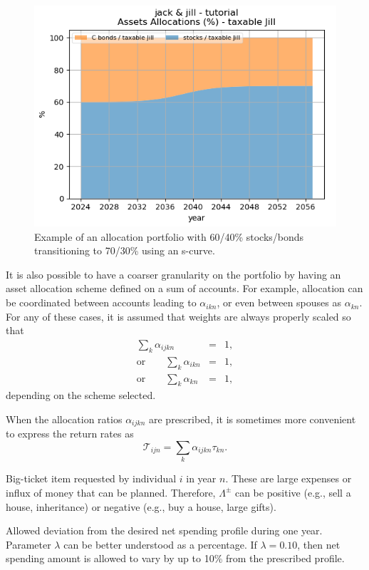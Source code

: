\documentclass{report}[fleqn,11pt]
\begin{document}
\begin{description}[leftmargin=4em,style=multiline]
	\begin{figure}[t]
	\includegraphics{allocations.png}
		\caption{\small Example of an allocation portfolio with 60/40\% stocks/bonds 
		transitioning to 70/30\% using an s-curve. \label{Fig:allocations}}
	\end{figure}
	It is also possible to have a coarser granularity on the portfolio by
	having an asset allocation scheme
	defined on a sum of accounts. For example, allocation can be coordinated between accounts
	leading to $\alpha_{ikn}$, or even between spouses as $\alpha_{kn}$.
	For any of these cases, it is assumed that weights are always properly scaled so that
	\begin{eqnarray}
		\sum_k \alpha_{ijkn} &=& 1, \nonumber\\
		\text{or} \qquad \sum_k \alpha_{ikn} &=& 1, \nonumber\\
		\text{or} \qquad \sum_k \alpha_{kn} &=& 1,
	\end{eqnarray}
	depending on the scheme selected.

\item[$\mathcal{T}_{ijn}$]
	When the allocation ratios $\alpha_{ijkn}$ are prescribed,
	it is sometimes more convenient to express the return rates as
	\begin{equation}
		\mathcal{T}_{ijn} = \sum_k \alpha_{ijkn} \tau_{kn}.
	\end{equation}

\item [$\Lambda^\pm_{in}$]
	Big-ticket item requested by individual $i$ in year $n$.
	These are large expenses or influx of money
	that can be planned. Therefore, $\Lambda^\pm$ can be positive
	(e.g., sell a house, inheritance) or negative (e.g., buy a house, large gifts).
\item [$\lambda$]
        Allowed deviation from the desired net spending profile during one year. Parameter
        $\lambda$ can be better understood as a percentage. If $\lambda = 0.10$, then net spending
	amount is allowed to vary by up to 10\% from the prescribed profile.


\end{description}
\end{document}

